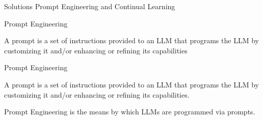 \documentclass[t]{beamer}
\begin{document}
\begin{frame}{Solutions}
  \vspace{5cm}
  \centering
  Prompt Engineering and Continual Learning
\end{frame}

\begin{frame}{Prompt Engineering}
  \vspace{1cm}
  \begin{definition}{A prompt}
    is a set of instructions provided to an LLM that programs the LLM by customizing it and/or enhancing or refining its capabilities  
  \end{definition}
\end{frame}
\begin{frame}{Prompt Engineering}
  \vspace{1cm}
  \begin{definition}{A prompt}
    is a set of instructions provided to an LLM that programs the LLM by customizing it and/or enhancing or refining its capabilities. \cite{LiuPengfei23}   
  \end{definition}
  \vspace{1cm}
  \begin{definition}{Prompt Engineering}
    is the means by which LLMs are programmed via prompts. \cite{LiuPengfei23}  
  \end{definition}
\end{frame}
\end{document}
